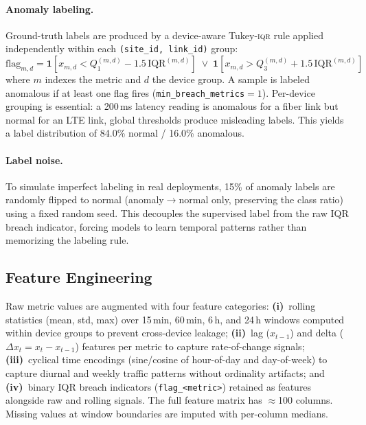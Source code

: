 \documentclass{article}
\newcommand{\iqr}{\textsc{iqr}\xspace}
\begin{document}
\paragraph{Anomaly labeling.}
Ground-truth labels are produced by a device-aware Tukey-\iqr rule applied
independently within each \texttt{(site\_id, link\_id)} group:
\begin{equation}
  \text{flag}_{m,d} =
    \mathbf{1}\!\left[x_{m,d} < Q_1^{(m,d)} - 1.5\,\mathrm{IQR}^{(m,d)}\right]
    \;\vee\;
    \mathbf{1}\!\left[x_{m,d} > Q_3^{(m,d)} + 1.5\,\mathrm{IQR}^{(m,d)}\right]
\end{equation}
where $m$ indexes the metric and $d$ the device group.
A sample is labeled anomalous if at least one flag fires
(\texttt{min\_breach\_metrics}$=1$).
Per-device grouping is essential: a 200\,ms latency reading is anomalous for
a fiber link but normal for an LTE link, global thresholds produce misleading
labels.
This yields a label distribution of 84.0\% normal / 16.0\% anomalous.

\paragraph{Label noise.}
To simulate imperfect labeling in real deployments, 15\% of anomaly labels are
randomly flipped to normal (anomaly$\to$normal only, preserving the class ratio)
using a fixed random seed.
This decouples the supervised label from the raw IQR breach indicator, forcing
models to learn temporal patterns rather than memorizing the labeling rule.

\subsection{Feature Engineering}

Raw metric values are augmented with four feature categories:
\textbf{(i)}~rolling statistics (mean, std, max) over 15\,min, 60\,min, 6\,h,
and 24\,h windows computed within device groups to prevent cross-device leakage;
\textbf{(ii)}~lag ($x_{t-1}$) and delta ($\Delta x_t = x_t - x_{t-1}$) features
per metric to capture rate-of-change signals;
\textbf{(iii)}~cyclical time encodings (sine/cosine of hour-of-day and day-of-week)
to capture diurnal and weekly traffic patterns without ordinality artifacts; and
\textbf{(iv)}~binary IQR breach indicators (\texttt{flag\_<metric>}) retained as
features alongside raw and rolling signals.
The full feature matrix has $\approx$100 columns.
Missing values at window boundaries are imputed with per-column medians.
\end{document}

